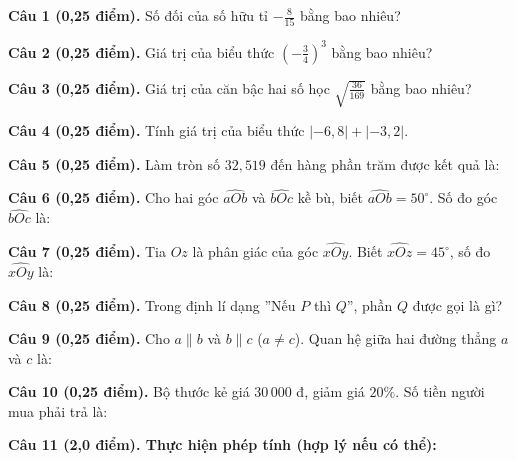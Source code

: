 \documentclass[12pt,a4paper]{article}
\begin{document}
\noindent\textbf{Câu 1 (0,25 điểm).} Số đối của số hữu tỉ $-\frac{8}{15}$ bằng bao nhiêu? \par\vspace{0.5mm}
\noindent\textbf{Câu 2 (0,25 điểm).} Giá trị của biểu thức $\left(-\frac{3}{4}\right)^3$ bằng bao nhiêu? \par\vspace{0.5mm}
\noindent\textbf{Câu 3 (0,25 điểm).} Giá trị của căn bậc hai số học $\sqrt{\frac{36}{169}}$ bằng bao nhiêu? \par\vspace{0.5mm}
\noindent\textbf{Câu 4 (0,25 điểm).} Tính giá trị của biểu thức $\lvert -6{,}8\rvert + \lvert -3{,}2\rvert$. \par\vspace{0.5mm}
\noindent\textbf{Câu 5 (0,25 điểm).} Làm tròn số $32{,}519$ đến hàng phần trăm được kết quả là: \par\vspace{0.5mm}
\noindent\textbf{Câu 6 (0,25 điểm).} Cho hai góc $\widehat{aOb}$ và $\widehat{bOc}$ kề bù, biết $\widehat{aOb}=50^\circ$. Số đo góc $\widehat{bOc}$ là: \par\vspace{0.5mm}
\noindent\textbf{Câu 7 (0,25 điểm).} Tia $Oz$ là phân giác của góc $\widehat{xOy}$. Biết $\widehat{xOz}=45^\circ$, số đo $\widehat{xOy}$ là: \par\vspace{0.5mm}
\noindent\textbf{Câu 8 (0,25 điểm).} Trong định lí dạng ''Nếu $P$ thì $Q$'', phần $Q$ được gọi là gì? \par\vspace{0.5mm}
\noindent\textbf{Câu 9 (0,25 điểm).} Cho $a \parallel b$ và $b \parallel c$ ($a \ne c$). Quan hệ giữa hai đường thẳng $a$ và $c$ là: \par\vspace{0.5mm}
\noindent\textbf{Câu 10 (0,25 điểm).} Bộ thước kẻ giá $30\,000$ đ, giảm giá $20\%$. Số tiền người mua phải trả là: \par\vspace{0.5mm}
\vspace{0.6mm}

\noindent\textbf{Câu 11 (2,0 điểm). Thực hiện phép tính (hợp lý nếu có thể):}
\vspace{0.8mm}
\end{document}
